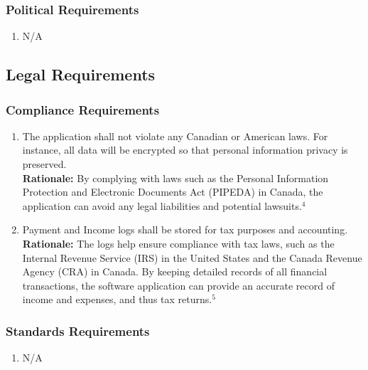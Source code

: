 \documentclass[]{article}
\begin{document}
\subsubsection{Political Requirements}
\label{ssub:political_requirements}
\begin{enumerate}[{CP-P}1. ]
	\item N/A
\end{enumerate}


\subsection{Legal Requirements}
\label{sub:legal_requirements}

\subsubsection{Compliance Requirements}
\label{ssub:compliance_requirements}
\begin{enumerate}[{LR-COMP}1. ]
	\item The application shall not violate any Canadian or American laws. For instance, all data will be encrypted so that personal information privacy is preserved.\\
	{\bf Rationale:} By complying with laws such as the Personal Information Protection and Electronic Documents Act (PIPEDA) in Canada, the application can avoid any legal liabilities and potential lawsuits.$^4$
	\item Payment and Income logs shall be stored for tax purposes and accounting.\\
	{\bf Rationale:} The logs help ensure compliance with tax laws, such as the Internal Revenue Service (IRS) in the United States and the Canada Revenue Agency (CRA) in Canada. By keeping detailed records of all financial transactions, the software application can provide an accurate record of income and expenses, and thus tax returns.$^5$
\end{enumerate}

\subsubsection{Standards Requirements}
\label{ssub:standards_requirements}
\begin{enumerate}[{LR-STD}1. ]
	\item N/A
\end{enumerate}
\end{document}
